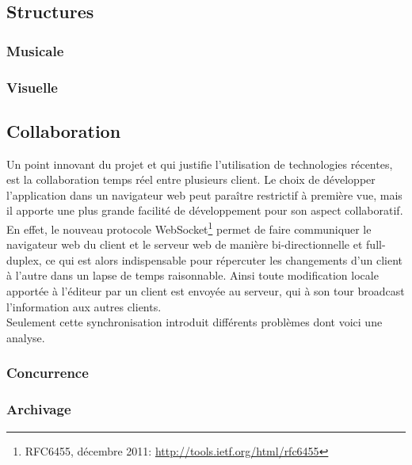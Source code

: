 \documentclass[pdftex,12pt,a4paper]{article}
\begin{document}
\subsection{Structures}

\subsubsection{Musicale}

\subsubsection{Visuelle}

\subsection{Collaboration}

Un point innovant du projet et qui justifie l’utilisation de technologies récentes, est la collaboration temps réel entre plusieurs client. Le choix de développer l’application dans un navigateur web peut paraître restrictif à première vue, mais il apporte une plus grande facilité de développement pour son aspect collaboratif.\\
En effet, le nouveau protocole WebSocket\footnote{RFC6455, décembre 2011: \url{http://tools.ietf.org/html/rfc6455}} permet de faire communiquer le navigateur web du client et le serveur web de manière bi-directionnelle et full-duplex, ce qui est alors indispensable pour répercuter les changements d’un client à l’autre dans un lapse de temps raisonnable. Ainsi toute modification locale apportée à l’éditeur par un client est envoyée au serveur, qui à son tour broadcast l’information aux autres clients.\\
Seulement cette synchronisation introduit différents problèmes dont voici une analyse.

\subsubsection{Concurrence}

\subsubsection{Archivage}
\end{document}
